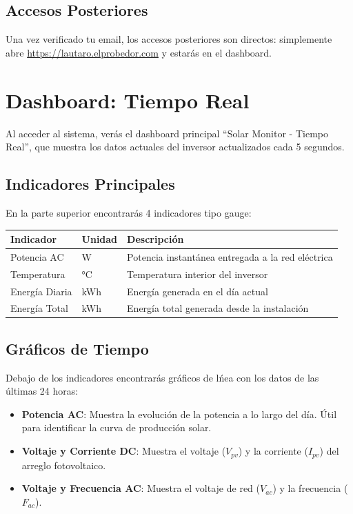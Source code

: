 \documentclass[12pt,a4paper]{article}
\begin{document}
\subsection{Accesos Posteriores}

Una vez verificado tu email, los accesos posteriores son directos: simplemente abre \url{https://lautaro.elprobedor.com} y estar\'as en el dashboard.

\section{Dashboard: Tiempo Real}

Al acceder al sistema, ver\'as el dashboard principal ``Solar Monitor - Tiempo Real'', que muestra los datos actuales del inversor actualizados cada 5 segundos.

\subsection{Indicadores Principales}

En la parte superior encontrar\'as 4 indicadores tipo gauge:

\begin{table}[H]
\centering
\begin{tabular}{llp{8cm}}
\toprule
\textbf{Indicador} & \textbf{Unidad} & \textbf{Descripci\'on} \\
\midrule
Potencia AC & W & Potencia instant\'anea entregada a la red el\'ectrica \\
Temperatura & °C & Temperatura interior del inversor \\
Energ\'ia Diaria & kWh & Energ\'ia generada en el d\'ia actual \\
Energ\'ia Total & kWh & Energ\'ia total generada desde la instalaci\'on \\
\bottomrule
\end{tabular}
\end{table}

\subsection{Gr\'aficos de Tiempo}

Debajo de los indicadores encontrar\'as gr\'aficos de l\'nea con los datos de las \'ultimas 24 horas:

\begin{itemize}
    \item \textbf{Potencia AC}: Muestra la evoluci\'on de la potencia a lo largo del d\'ia. \'Util para identificar la curva de producci\'on solar.
    \item \textbf{Voltaje y Corriente DC}: Muestra el voltaje ($V_{pv}$) y la corriente ($I_{pv}$) del arreglo fotovoltaico.
    \item \textbf{Voltaje y Frecuencia AC}: Muestra el voltaje de red ($V_{ac}$) y la frecuencia ($F_{ac}$).
\end{itemize}
\end{document}
